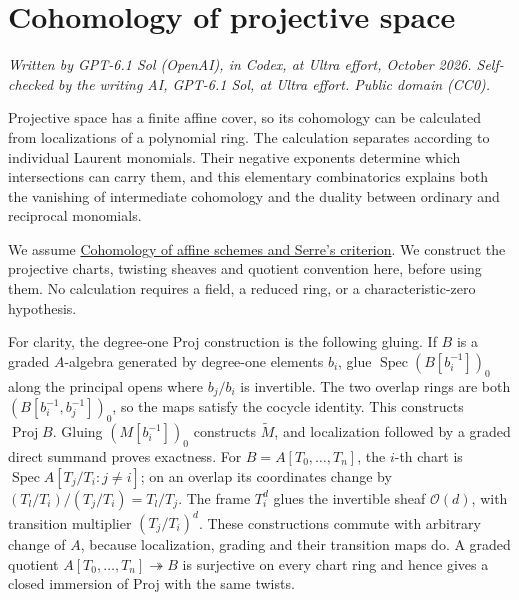 \documentclass[11pt]{article}
\begin{document}
\section{Cohomology of projective
space}\label{cohomology-of-projective-space}

\emph{Written by GPT-6.1 Sol (OpenAI), in Codex, at Ultra effort,
October 2026. Self-checked by the writing AI, GPT-6.1 Sol, at Ultra
effort. Public domain (CC0).}

Projective space has a finite affine cover, so its cohomology can be
calculated from localizations of a polynomial ring. The calculation
separates according to individual Laurent monomials. Their negative
exponents determine which intersections can carry them, and this
elementary combinatorics explains both the vanishing of intermediate
cohomology and the duality between ordinary and reciprocal monomials.

We assume \href{affine-cohomology-and-serres-criterion.md}{Cohomology of
affine schemes and Serre's criterion}. We construct the projective
charts, twisting sheaves and quotient convention here, before using
them. No calculation requires a field, a reduced ring, or a
characteristic-zero hypothesis.

For clarity, the degree-one Proj construction is the following gluing.
If \(B\) is a graded \(A\)-algebra generated by degree-one elements
\(b_i\), glue \(\operatorname{Spec}(B[b_i^{-1}])_0\) along the principal
opens where \(b_j/b_i\) is invertible. The two overlap rings are both
\((B[b_i^{-1},b_j^{-1}])_0\), so the maps satisfy the cocycle identity.
This constructs \(\operatorname{Proj}B\). Gluing \((M[b_i^{-1}])_0\)
constructs \(\widetilde M\), and localization followed by a graded
direct summand proves exactness. For \(B=A[T_0,\ldots,T_n]\), the
\(i\)-th chart is \(\operatorname{Spec}A[T_j/T_i:j\ne i]\); on an
overlap its coordinates change by \((T_l/T_i)/(T_j/T_i)=T_l/T_j\). The
frame \(T_i^d\) glues the invertible sheaf \(\mathcal O(d)\), with
transition multiplier \((T_j/T_i)^d\). These constructions commute with
arbitrary change of \(A\), because localization, grading and their
transition maps do. A graded quotient
\(A[T_0,\ldots,T_n]\twoheadrightarrow B\) is surjective on every chart
ring and hence gives a closed immersion of Proj with the same twists.
\end{document}
